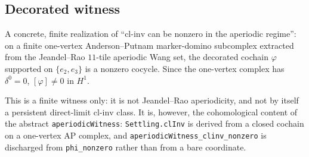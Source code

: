 \subsection{Decorated witness}

\begin{theorem}\label{thm:jeandel-rao-witness}\leanok{}
A concrete, finite realization of ``$\mathrm{cl\text{-}inv}$ can be nonzero in
the aperiodic regime'': on a finite one-vertex Anderson--Putnam
marker-domino subcomplex extracted from the Jeandel--Rao $11$-tile aperiodic
Wang set, the decorated cochain $\varphi$ supported on $\{e_2,e_3\}$ is a
nonzero cocycle. Since the one-vertex complex has $\delta^0 = 0$,
$[\varphi]\neq0$ in $H^1$.

This is a finite witness only: it is not Jeandel--Rao aperiodicity, and not by
itself a persistent direct-limit $\mathrm{cl\text{-}inv}$ class. It is,
however, the cohomological content of the abstract
\texttt{aperiodicWitness}: \texttt{Settling.clInv} is derived from a closed
cochain on a one-vertex AP complex, and
\texttt{aperiodicWitness\_clinv\_nonzero} is discharged from
\texttt{phi\_nonzero} rather than from a bare coordinate.
\end{theorem}
